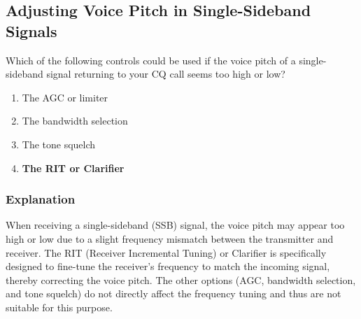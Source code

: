 \subsection{Adjusting Voice Pitch in Single-Sideband Signals}
\label{T4B06}

\begin{tcolorbox}[colback=gray!10!white,colframe=black!75!black,title=T4B06]
Which of the following controls could be used if the voice pitch of a single-sideband signal returning to your CQ call seems too high or low?
\begin{enumerate}[noitemsep]
    \item The AGC or limiter
    \item The bandwidth selection
    \item The tone squelch
    \item \textbf{The RIT or Clarifier}
\end{enumerate}
\end{tcolorbox}

\subsubsection*{Explanation}
When receiving a single-sideband (SSB) signal, the voice pitch may appear too high or low due to a slight frequency mismatch between the transmitter and receiver. The RIT (Receiver Incremental Tuning) or Clarifier is specifically designed to fine-tune the receiver's frequency to match the incoming signal, thereby correcting the voice pitch. The other options (AGC, bandwidth selection, and tone squelch) do not directly affect the frequency tuning and thus are not suitable for this purpose.